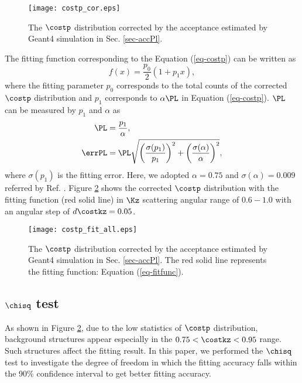 \begin{figure}[h]
  \centering
  \texttt{[image: costp\_cor.eps]}
  \caption{The $\costp$ distribution corrected by the acceptance estimated by Geant4 simulation in Sec. \ref{sec-accPl}.}
  \label{fig-costp_cor}
\end{figure}

The fitting function corresponding to the Equation (\ref{eq-costp}) can be written as
\begin{equation}
  f(x) = \frac{p_0}{2} (1+p_1x),
  \label{eq-fitfunc}
\end{equation}
where the fitting parameter $p_0$ corresponds to the total counts of the corrected $\costp$ distribution and $p_1$ corresponds to $\alpha\PL$ in Equation (\ref{eq-costp}). $\PL$ can be measured by $p_1$ and $\alpha$ as
\begin{align}
  \PL &= \frac{p_1}{\alpha}, \label{eq-PL} \\
  \errPL &= \PL \sqrt{ \left( \frac{\sigma(p_1)}{p_1} \right)^2 + \left( \frac{\sigma(\alpha)}{\alpha} \right)^2},
\end{align}
where $\sigma(p_1)$ is the fitting error. %
Here, we adopted $\alpha=0.75$ and $\sigma(\alpha)=0.009$ referred by Ref. \cite{Alpha}. Figure \ref{fig-costp_fit_all} shows the corrected $\costp$ distribution with the fitting function (red solid line) in $\Kz$ scattering angular range of $0.6 - 1.0$ with an angular step of $d\costkz=0.05$. 

\begin{figure}[h]
  \centering
  \texttt{[image: costp\_fit\_all.eps]}
  \caption{The $\costp$ distribution corrected by the acceptance estimated by Geant4 simulation in Sec. \ref{sec-accPl}. The red solid line represents the fitting function: Equation (\ref{eq-fitfunc}).}
  \label{fig-costp_fit_all}
\end{figure}


\subsection{$\chisq$ test}

As shown in Figure \ref{fig-costp_fit_all}, due to the low statistics of $\costp$ distribution, background structures appear especially in the $0.75<\costkz<0.95$ range. Such structures affect the fitting result. In this paper, we performed the $\chisq$ test to investigate the degree of freedom in which the fitting accuracy falls within the 90\% confidence interval to get better fitting accuracy. 

